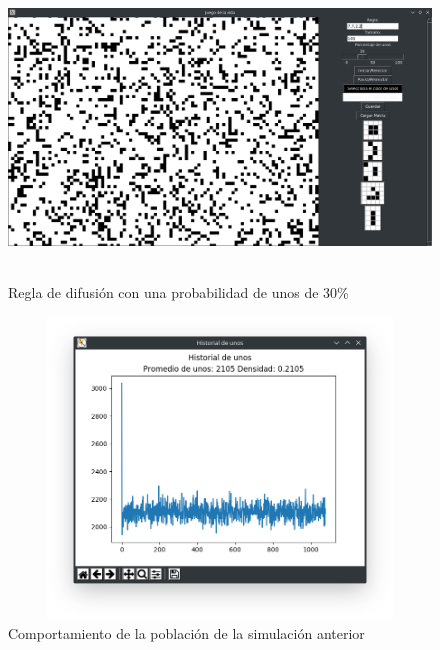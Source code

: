 \begin{figure}[H]
\begin{center}
 \includegraphics[width=12cm, height=8cm]{./img/diffusion30.png}
 \caption{Regla de difusión con una probabilidad de unos de 30\%}
 \label{fig:diffusion30}
\end{center}
\end{figure}

\begin{figure}[H]
\begin{center}
 \includegraphics[width=12cm, height=8cm]{./img/diffusion30grafica.png}
 \caption{Comportamiento de la población de la simulación anterior}
 \label{fig:diffusion30grafica}
\end{center}
\end{figure}

